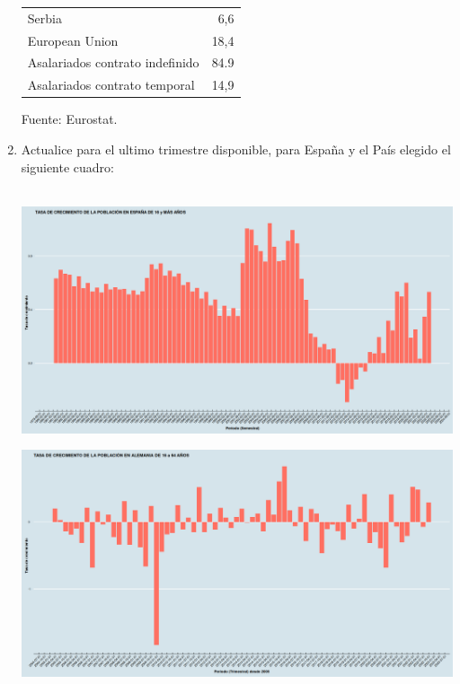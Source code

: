 \begin{enumerate}
\begin{table}[htbp]
{\begin{tabular}{lr}
	   \quad Serbia&6,6\\
	   \quad European Union&18,4\\
	   Asalariados contrato indefinido&84.9\\
	   Asalariados contrato temporal&14,9\\
	\bottomrule
	\end{tabular}%
	}
      \label{tab:addlabel}%
      \begin{center}
      \tiny Fuente: Eurostat.
      \end{center}
    \end{table}
    \vspace{2.5cm}


    \item Actualice para el ultimo trimestre disponible, para España y el País elegido el siguiente cuadro:\\\\


	\begin{center}
	    \includegraphics[scale=0.27]{image/tasa_crecimiento.png}
	\end{center}

	\begin{center}
	    \includegraphics[scale=0.27]{image/tasa_crecimientoA.png}
	\end{center}


\end{enumerate}
